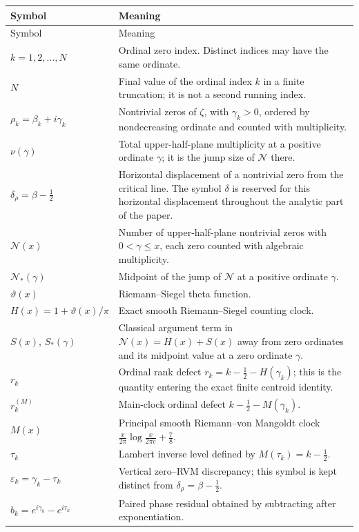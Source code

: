 \documentclass[11pt]{amsart}
\numberwithin{equation}{section}
\theoremstyle{definition}
\theoremstyle{remark}
\begin{document}
\begin{longtable}{@{}p{}p{}@{}}
\toprule
Symbol & Meaning \\
\midrule
\endfirsthead
\toprule
Symbol & Meaning \\
\midrule
\endhead
$k=1,2,\ldots,N$ & Ordinal zero index. Distinct indices may have the same ordinate. \\
$N$ & Final value of the ordinal index $k$ in a finite truncation; it is not a second running index. \\
$\rho_k=\beta_k+i\gamma_k$ & Nontrivial zeros of $\zeta$, with $\gamma_k>0$, ordered by nondecreasing ordinate and counted with multiplicity. \\
$\nu(\gamma)$ & Total upper-half-plane multiplicity at a positive ordinate $\gamma$; it is the jump size of $\mathcal N$ there. \\
$\delta_\rho=\beta-\tfrac12$ & Horizontal displacement of a nontrivial zero from the critical line. The symbol $\delta$ is reserved for this horizontal displacement throughout the analytic part of the paper. \\
$\mathcal N(x)$ & Number of upper-half-plane nontrivial zeros with $0<\gamma\le x$, each zero counted with algebraic multiplicity. \\
$\mathcal N_*(\gamma)$ & Midpoint of the jump of $\mathcal N$ at a positive ordinate $\gamma$. \\
$\vartheta(x)$ & Riemann--Siegel theta function. \\
$H(x)=1+\vartheta(x)/\pi$ & Exact smooth Riemann--Siegel counting clock. \\
$S(x)$, $S_*(\gamma)$ & Classical argument term in $\mathcal N(x)=H(x)+S(x)$ away from zero ordinates and its midpoint value at a zero ordinate $\gamma$. \\
$r_k$ & Ordinal rank defect $r_k=k-\tfrac12-H(\gamma_k)$; this is the quantity entering the exact finite centroid identity. \\
$r_k^{(M)}$ & Main-clock ordinal defect $k-\tfrac12-M(\gamma_k)$. \\
$M(x)$ & Principal smooth Riemann--von Mangoldt clock $\frac{x}{2\pi}\log\frac{x}{2\pi e}+\frac78$. \\
$\tau_k$ & Lambert inverse level defined by $M(\tau_k)=k-\tfrac12$. \\
$\varepsilon_k=\gamma_k-\tau_k$ & Vertical zero--RVM discrepancy; this symbol is kept distinct from $\delta_\rho=\beta-\tfrac12$. \\
$b_k=e^{i\gamma_k}-e^{i\tau_k}$ & Paired phase residual obtained by subtracting after exponentiation. \\

\end{longtable}
\end{document}
